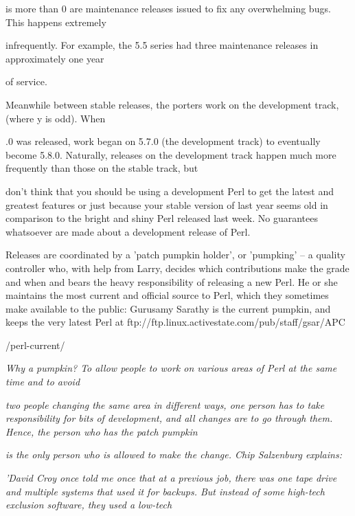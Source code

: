 \documentclass[a4paper,11pt]{book}
\begin{document}
\noindent is  more than 0 are maintenance  releases  issued  to  fix  any  overwhelming  bugs.  This  happens  extremely

\noindent infrequently.  For example,  the  5.5  series  had  three  maintenance  releases  in  approximately one year

\noindent of service.

\noindent 

\noindent 

\noindent Meanwhile between stable releases, the porters work on the development track, (where y is odd). When

.0 was released, work began on 5.7.0 (the development track) to eventually become 5.8.0. Naturally, releases on the development track happen much more frequently than those on the stable track, but

\noindent don't think that you should be using a development Perl to get the latest and greatest features or just because your stable version of last year seems old in comparison to the bright and shiny Perl released last week. No guarantees whatsoever are made about a development release of Perl.

\noindent 

\noindent Releases are coordinated by a 'patch pumpkin holder', or 'pumpking' -- a quality controller who, with help from Larry, decides which contributions make the grade and when and bears the heavy responsibility of releasing a new Perl. He or she maintains the most current and official source to Perl, which they sometimes make available to the public: Gurusamy Sarathy is the current pumpkin, and keeps the very latest Perl at ftp://ftp.linux.activestate.com/pub/staff/gsar/APC

\noindent /perl-current/

\noindent 

\noindent \textit{Why a pumpkin? To allow people to work on various areas of Perl at the same time and to avoid}

\noindent \textit{two people changing the same area in different ways, one person has to take responsibility for bits of development, and all changes are to go through them. Hence, the person who has the patch pumpkin}

\noindent \textit{is the only person who is allowed to make the change. Chip Salzenburg explains:}

\noindent \textit{'David Croy once told me once that at a previous job, there was one tape drive and multiple systems that used it for backups. But instead of some high-tech exclusion software, they used a low-tech}
\end{document}
